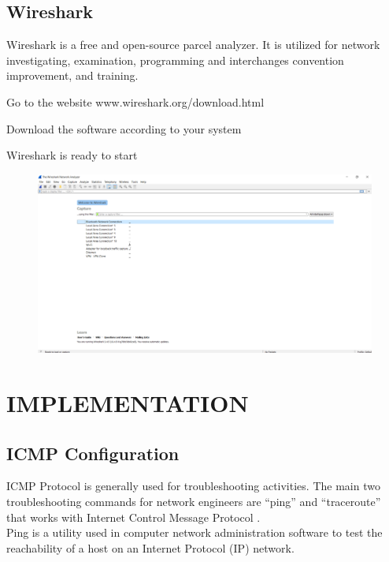 \documentclass[12pt,a4paper]{article}
\begin{document}
\subsection{Wireshark}
Wireshark is a free and open-source parcel analyzer. It is utilized for network investigating, examination, programming and interchanges convention improvement, and training.
\begin{steps}
  \item Go to the website www.wireshark.org/download.html

\item Download the software according to your system
\item Wireshark is ready to start

\begin{figure}[h]
 		\centering
				\includegraphics[scale=0.25]{6.2.png}	
				
	\end{figure}
\end{steps}
\pagebreak
\section{\Large{IMPLEMENTATION}}
\subsection{ICMP Configuration }

ICMP Protocol is generally used for troubleshooting activities. The main two troubleshooting commands for network engineers are “ping” and “traceroute” that works with Internet Control Message Protocol .\\

Ping is a utility used in computer network administration software to test the reachability of a host on an Internet Protocol (IP) network.\\
\end{document}
